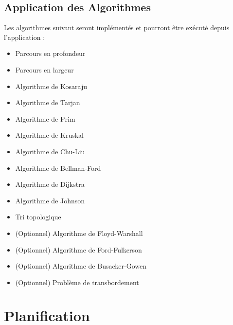 \documentclass[french]{article}
\begin{document}
		\subsection{Application des Algorithmes}
			Les algorithmes suivant seront implémentés et pourront être exécuté depuis
      l'application :
			\begin{itemize}
				\item Parcours en profondeur
        \item Parcours en largeur
        \item Algorithme de Kosaraju
        \item Algorithme de Tarjan
        \item Algorithme de Prim
        \item Algorithme de Kruskal
        \item Algorithme de Chu-Liu
        \item Algorithme de Bellman-Ford
        \item Algorithme de Dijkstra
        \item Algorithme de Johnson
        \item Tri topologique
        \item (Optionnel) Algorithme de Floyd-Warshall
        \item (Optionnel) Algorithme de Ford-Fulkerson
        \item (Optionnel) Algorithme de Busacker-Gowen
				\item (Optionnel) Problème de transbordement
			\end{itemize}

	\section{Planification}
\end{document}
